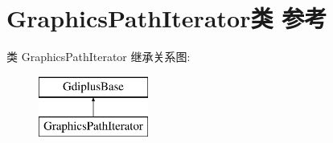 \hypertarget{class_graphics_path_iterator}{}\section{Graphics\+Path\+Iterator类 参考}
\label{class_graphics_path_iterator}
类 Graphics\+Path\+Iterator 继承关系图\+:\begin{figure}[H]
\begin{center}
\leavevmode
\includegraphics[height=2.000000cm]{class_graphics_path_iterator}
\end{center}
\end{figure}
